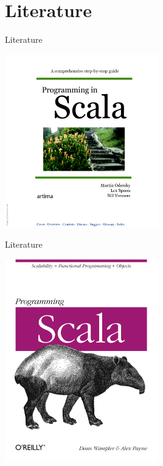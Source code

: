 \section{Literature}
\begin{frame}{Literature}
\begin{center}
\includegraphics[width=0.5\textwidth]{resources/ProgrammingInScala.png}
\end{center}
\end{frame}
\begin{frame}{Literature}
\begin{center}
\includegraphics[width=0.5\textwidth]{resources/ProgrammingScala.png}
\end{center}
\end{frame}

